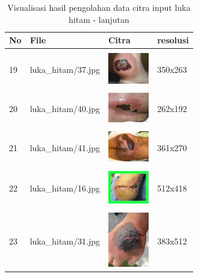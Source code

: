 \begin{table}[H]
	\centering
	\caption{Visualisasi hasil pengolahan data citra input luka hitam - lanjutan}
	\label{tabel_input_3}
	\begin{tabular}{|m{0.2in}|m{1.2in}|m{0.7in}|m{0.7in}|}
		\hline
		\textbf{No} & \textbf{File} & \textbf{Citra} & \textbf{resolusi} \\
		\hline

		& &  &  \\
		19& 
		luka\_hitam/37.jpg &
		\includegraphics[width=0.7in]{gambar/dataset_citra/luka_hitam/37.jpg}&
		350x263\\
		\hline
		
		& &  &  \\
		20& 
		luka\_hitam/40.jpg &
		\includegraphics[width=0.7in]{gambar/dataset_citra/luka_hitam/40.jpg}&
		262x192\\
		\hline
		
		& &  &  \\
		21& 
		luka\_hitam/41.jpg &
		\includegraphics[width=0.7in]{gambar/dataset_citra/luka_hitam/41.jpg}&
		361x270\\
		\hline

		& &  &  \\
		22 & 
		luka\_hitam/16.jpg &
		\includegraphics[width=0.7in]{gambar/dataset_citra/luka_hitam/16.jpg}&
		512x418\\
		\hline
		
		& &  &  \\
		23 & 
		luka\_hitam/31.jpg &
		\includegraphics[width=0.7in]{gambar/dataset_citra/luka_hitam/31.jpg}&
		383x512\\
		\hline
		

\end{tabular}
\end{table}
